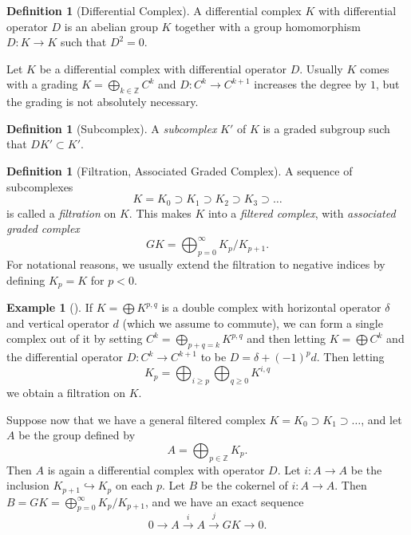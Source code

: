 \documentclass[reqno]{amsart}
\theoremstyle{definition}
\newtheorem{definition}[theorem]{Definition}
\newtheorem{example}[theorem]{Example}
\theoremstyle{remark}
\begin{document}
\begin{definition}[Differential Complex]
    A differential complex $K$ with differential operator
    $D$ is an abelian group $K$ together with
    a group homomorphism $D \colon K \to K$ such that
    $D^2 = 0$.
\end{definition}

Let $K$ be a differential complex with differential operator
$D$.
Usually $K$ comes with a grading
$K = \bigoplus_{k \in \mathbb{Z}}C^{k}$ and
$D \colon C^{k} \to C^{k+1}$ increases the
degree by $1$, but the grading is not
absolutely necessary.

\begin{definition}[Subcomplex]
    A \textit{subcomplex} $K'$ of $K$ is a
    graded subgroup such that $DK' \subset 
    K'$.
\end{definition}

\begin{definition}[Filtration, Associated Graded Complex]
    A sequence of subcomplexes
    \[
    K = K_0 \supset K_1 \supset K_2 \supset K_3 \supset
    \ldots
    \] 
    is called a \textit{filtration} on $K$.
    This makes $K$ into a \textit{filtered complex}, with
    \textit{associated graded complex}
    \[
    GK = \bigoplus_{p=0}^{\infty} K_p / K_{p+1}.
    \] 
    For notational reasons, we usually extend the
    filtration to negative indices
    by defining
    $K_p = K$ for $p < 0$.
\end{definition}

\begin{example}[]
    If $K = \bigoplus K^{p,q}$ is a double complex with
    horizontal operator $\delta$ and vertical operator
    $d$ (which we assume
    to commute), we can form a single complex out of it by
    setting $C^{k} = \bigoplus_{p+q=k} K^{p,q}$ and
    then letting
    $K = \bigoplus C^{k}$ and
    the differential operator
    $D \colon C^{k} \to C^{k+1}$ to be
    $D = \delta + (-1)^{p} d$. 
    Then letting
    \[
    K_p = \bigoplus_{i\ge p} \bigoplus_{q \ge 0}
    K^{i,q}
    \] 
    we obtain a filtration on
    $K$.
\end{example}




Suppose now that we have a general filtered
complex $K
= K_0 \supset K_1 \supset \ldots$, and let $A$ be the group defined
by
\[
A = \bigoplus_{p \in \mathbb{Z}} K_p.
\] 
Then $A$ is again a differential complex with
operator $D$.
Let $i \colon A \to A$ be the inclusion
$K_{p+1} \hookrightarrow K_{p}$ on each $p$.
Let $B$ be the cokernel of $i \colon A \to A$.
Then $B = GK =
\bigoplus_{p=0}^{\infty} K_p / K_{p+1}$, and
we have an exact sequence
\[
0 \to A \stackrel{i}{\to} A
\stackrel{j}{\to} GK \to 0.
\] 
\end{document}
